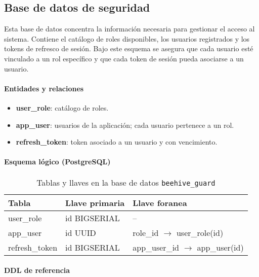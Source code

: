 \label{subsec:db_guard}

\subsection{Base de datos de seguridad}
Esta base de datos concentra la información necesaria para gestionar el acceso al sistema. Contiene el catálogo de roles disponibles, los usuarios registrados y los tokens de refresco de sesión. Bajo este esquema se asegura que cada usuario esté vinculado a un rol específico y que cada token de sesión pueda asociarse a un usuario.
\paragraph{Entidades y relaciones}
\begin{itemize}
  \item \textbf{user\_role}: catálogo de roles.
  \item \textbf{app\_user}: usuarios de la aplicación; cada usuario pertenece a un rol.
  \item \textbf{refresh\_token}: token asociado a un usuario y con vencimiento.
\end{itemize}

\paragraph{Esquema lógico (PostgreSQL)}
\begin{table}[H]
\centering
\caption{Tablas y llaves en la base de datos \texttt{beehive\_guard}}
\label{tab:guard_schema}
\begin{tabular}{|l|l|l|}
\hline
\textbf{Tabla} & \textbf{Llave primaria} & \textbf{Llave foranea} \\ \hline
user\_role & id BIGSERIAL & -- \\ \hline
app\_user & id UUID & role\_id \(\rightarrow\) user\_role(id) \\ \hline
refresh\_token & id BIGSERIAL &
app\_user\_id \(\rightarrow\) app\_user(id) \\ \hline
\end{tabular}
\end{table}

\paragraph{DDL de referencia}

